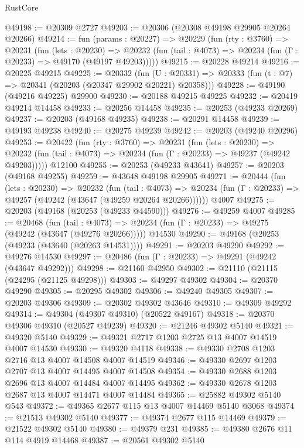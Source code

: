 \begin{lexlean}{RustCore}
\begin{coremodule}
@49198 := @20309 @2727
@49203 := @20306 (@20308 @49198 @29905 @20264 @20266)
@49214 := fun (params : @20227) =>
  @20229
    (fun (rty : @3760) =>
    @20231
      (fun (lets : @20230) =>
      @20232 (fun (tail : @4073) => @20234 (fun (Γ : @20233) => @49170 (@49197 @49203)))))
@49215 := @20228 @49214
@49216 := @20225 @49215
@49225 := @20332
    (fun (U : @20331) => @20333 (fun (t : @7) => @20341 (@20203 (@20347 @29902 @20221) @20358)))
@49228 := @49190 (@49216 @49225) @29900
@49230 := @20188 @49215 @49225
@49232 := @20419 @49214 @14458
@49233 := @20256 @14458
@49235 := @20253 (@49233 @20269)
@49237 := @20203 (@49168 @49235)
@49238 := @20291 @14458
@49239 := @49193 @49238
@49240 := @20275 @49239
@49242 := @20203 (@49240 @20296)
@49253 := @20422
    (fun (rty : @3760) =>
    @20231
      (fun (lets : @20230) =>
      @20232 (fun (tail : @4073) => @20234 (fun (Γ : @20233) => @49237 (@49242 @49203)))))
    @12100
@49255 := @20253 (@49233 @43641)
@49257 := @20203 (@49168 @49255)
@49259 := @43648 @49198 @29905
@49271 := @20444
    (fun (lets : @20230) =>
    @20232
      (fun (tail : @4073) =>
      @20234 (fun (Γ : @20233) => @49257 (@49242 (@43647 (@49259 @20264 @20266))))))
    @4007
@49275 := @20203 (@49168 (@20253 (@49233 @44590)))
@49276 := @49259 @4007
@49285 := @20468
    (fun (tail : @4073) => @20234 (fun (Γ : @20233) => @49275 (@49242 (@43647 (@49276 @20266)))))
    @14530
@49290 := @49168 (@20253 (@49233 (@43640 (@20263 @14531))))
@49291 := @20203 @49290
@49292 := @49276 @14530
@49297 := @20486 (fun (Γ : @20233) => @49291 (@49242 (@43647 @49292)))
@49298 := @21160 @42950
@49302 := @21110 (@21115 (@24295 (@21125 @49298)))
@49303 := @49297 @49302
@49304 := @20370 @49290
@49305 := @20295 @49302
@49306 := @49240 @49305
@49307 := @20203 @49306
@49309 := @20302 @49302 @43646
@49310 := @49309 @49292
@49314 := @49304 (@49307 @49310) (@20522 @49167)
@49318 := @20370 @49306 @49310 (@20527 @49239)
@49320 := @21246 @49302 @5140
@49321 := @49320 @5140
@49329 := @49321 @2717 @1203 @2725 @13 @4007 @14519 @4007 @14530
@49330 := @49320 @4118
@49338 := @49330 @2708 @1203 @2716 @13 @4007 @14508 @4007 @14519
@49346 := @49330 @2697 @1203 @2707 @13 @4007 @14495 @4007 @14508
@49354 := @49330 @2688 @1203 @2696 @13 @4007 @14484 @4007 @14495
@49362 := @49330 @2678 @1203 @2687 @13 @4007 @14471 @4007 @14484
@49365 := @25882 @49302 @5140 @543
@49372 := @49365 @2677 @115 @13 @4007 @14469 @5140 @3068
@49374 := @21513 @49302 @5140
@49377 := @49374 @2677 @115 @14469
@49379 := @21522 @49302 @5140
@49380 := @49379 @231
@49385 := @49380 @2676 @11 @114 @4919 @14468
@49387 := @20561 @49302 @5140

\end{coremodule}
\end{lexlean}
